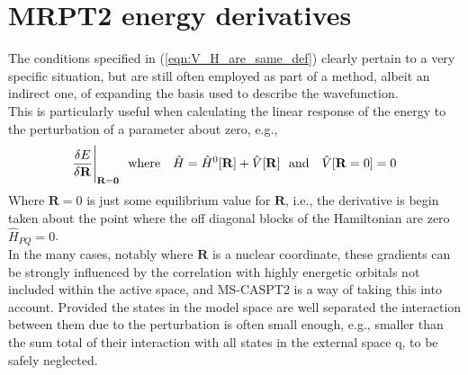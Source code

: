 \section {MRPT2 energy derivatives}
\noindent The conditions specified in (\ref{eqn:V_H_are_same_def}) clearly pertain to 
a very specific situation, but are still often employed as part of a method, albeit an 
indirect one, of expanding the basis used to describe the wavefunction.\\

\noindent This is particularly useful when calculating the linear response of the energy to the
perturbation of a parameter about zero, e.g., 
\begin{equation}
\frac{ \delta E }{ \delta \mathbf{R} } \Bigg{|}_{\mathbf{\mathbf{R}=0}}
\text{\ \ where \ \ }
\hat{H} = \hat{H}^{0}[\mathbf{R}] + \hat{V}[\mathbf{R}] 
\text{\ \ and \ \ }
\hat{V}[\mathbf{R} = 0 ]  = 0 
\end{equation}
Where $\mathbf{R} = 0$ is just some equilibrium value for $\mathbf{R}$, i.e., the derivative is begin taken
about the point where the off diagonal blocks of the Hamiltonian are zero $\hat{H}_{PQ} = 0$. \\

\noindent  In the many cases, notably where $\mathbf{R}$ is a nuclear coordinate,
these gradients can be strongly influenced by the correlation with highly energetic orbitals not included
within the active space, and MS-CASPT2 is a way of taking this into account.
Provided the states in the model space are well separated the interaction between them due
to the perturbation is often small enough, e.g., smaller than the sum total of their 
interaction with all states in the external space $\mathrm{q}$, to be safely neglected.\\


